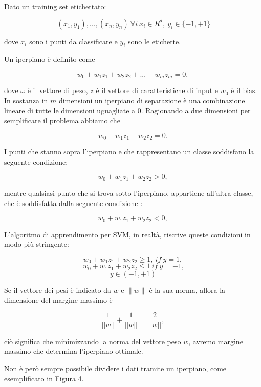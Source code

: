 \documentclass[12pt,italian]{report}
\begin{document}
Dato un training set etichettato:

\begin{center}
	\[
	\ (x_1, y_1), ..., (x_n, y_n)
	\ \forall i 
	\ x_i \in R^{d},
	\ y_i \in  \{ -1, +1 \}
	\]
\end{center}
dove $x_i$ sono i punti da classificare e $y_i$ sono le etichette.

Un iperpiano è definito come 
\begin{center}
	\[w_0 + w_1z_1 + w_2z_2 +...+ w_mz_m= 0,\]
\end{center}
dove $\omega$ è il vettore di peso, $z$ è il vettore di caratteristiche di input e $w_0$ è il bias.
In sostanza in $m$ dimensioni un iperpiano di separazione è una combinazione lineare di tutte le dimensioni uguagliate a 0.
Ragionando a due dimensioni per semplificare il problema abbiamo che 
\begin{center}
	\[w_0 + w_1z_1 + w_2z_2 = 0.\]
\end{center}
I punti che stanno sopra l'iperpiano e che rappresentano un classe soddisfano la seguente condizione:
\begin{center}
	\[w_0 + w_1z_1+w_2z_2 > 0,\]
\end{center}
mentre qualsiasi punto che si trova sotto l'iperpiano, appartiene all'altra classe, che è soddisfatta dalla seguente condizione :
\begin{center}
	\[w_0 + w_1z_1+w_2z_2 < 0,\]
\end{center}
L'algoritmo di apprendimento per SVM, in realtà, riscrive queste condizioni in modo più stringente:
\begin{center}
	\[w_0 + w_1z_1+w_2z_2 \geq 1,
	\ if
	\ y=1,\]
	\[
	\ w_0 + w_1z_1+w_2z_2 \leq 1 
	\ if
	\ y = -1,
	\]
	\[ y \in (-1, +1)\]
\end{center}
Se il vettore dei pesi è indicato da $w$ e $\parallel w \parallel$ è la sua norma, allora la dimensione del margine massimo è 
\begin{center}
	\[ \frac{1}{\left || w \right ||} + \frac{1}{\left || w \right ||} = \frac{2}{\left || w \right ||},\]
\end{center}
ciò significa che minimizzando la norma del vettore peso $w$, avremo margine massimo che determina l'iperpiano ottimale.

Non è però sempre possibile dividere i dati tramite un iperpiano, come esemplificato in Figura 4.
\end{document}
